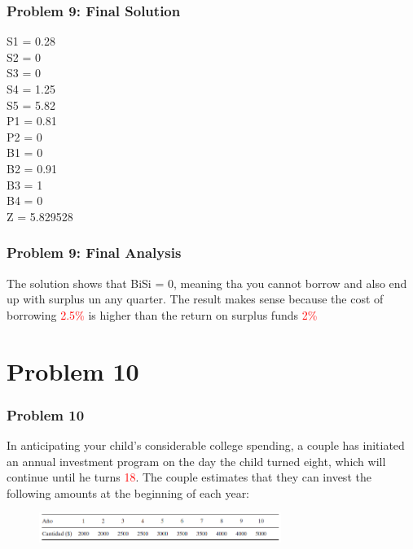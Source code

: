 \documentclass[10pt,svgnames,fragile]{beamer}
\begin{document}
\begin{frame}[label={sec:org9c62e72}]{}
\frametitle{Problem 9: Final Solution}

S1 = 0.28\\
S2 = 0\\
S3 = 0\\
S4 = 1.25\\
S5 = 5.82\\
P1 = 0.81\\
P2 = 0\\

B1 = 0\\
B2 = 0.91\\
B3 = 1\\
B4 = 0\\
Z = 5.829528
\end{frame}


\begin{frame}[label={sec:org9c62e72}]{}
\frametitle{Problem 9: Final Analysis}

The solution shows that BiSi = 0, meaning tha you cannot borrow and also end up with surplus un any quarter. The result makes sense because the cost of borrowing \textcolor{red}{2.5\%} is higher than the return on surplus funds \textcolor{red}{2\%}


\end{frame}


\section{Problem 10}
\label{sec:org92dd686}

\begin{frame}
\frametitle{Problem 10}

In anticipating your child's considerable college spending, a couple has initiated an annual investment program on the day the child turned eight, which will continue until he turns \textcolor{red}{18}. The couple estimates that they can invest the following amounts at the beginning of each year:
\begin{figure}
\includegraphics[width=0.7\textwidth]{images/io5.PNG}
\end{figure}

\end{frame}
\end{document}
